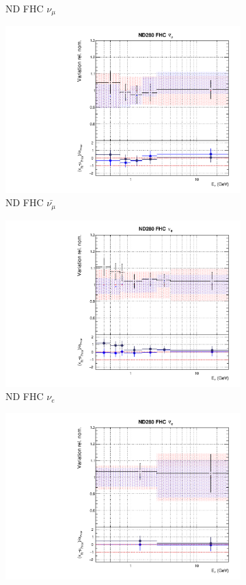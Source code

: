 \begin{figure}[t]
\begin{subfigure}{0.42\textwidth}
  \caption{ND FHC $\nu_{\mu}$}
\end{subfigure}
\begin{subfigure}{0.42\textwidth}
  \centering
  \includegraphics[width=0.75\linewidth]{figs/rhcmpdat28flux_1}
  \caption{ND FHC $\bar{\nu_{\mu}}$}
\end{subfigure}
\begin{subfigure}{0.42\textwidth}
  \centering
  \includegraphics[width=0.75\linewidth]{figs/rhcmpdat28flux_2}
  \caption{ND FHC $\nu_e$}
\end{subfigure}
\begin{subfigure}{0.42\textwidth}
  \centering
  \includegraphics[width=0.75\linewidth]{figs/rhcmpdat28flux_3}

\end{subfigure}
\end{figure}
